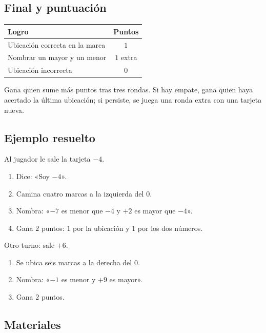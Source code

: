 \documentclass[12pt, letterpaper]{article}
\begin{document}
\subsection{Final y puntuación}

\begin{center}
\small
\begin{tabular}{@{}p{8.8cm} c@{}}
\toprule
\textbf{Logro} & \textbf{Puntos}\\
\midrule
Ubicación correcta en la marca & $1$\\
Nombrar un mayor y un menor & $1$ extra\\
Ubicación incorrecta & $0$\\
\bottomrule
\end{tabular}
\end{center}

Gana quien sume más puntos tras tres rondas. Si hay empate, gana quien haya acertado la última ubicación; si persiste, se juega una ronda extra con una tarjeta nueva.

\subsection{Ejemplo resuelto}

Al jugador le sale la tarjeta $-4$.

\begin{cuadrosolucion}
\begin{enumerate}[leftmargin=*]
  \item Dice: «Soy $-4$».
  \item Camina cuatro marcas a la izquierda del $0$.
  \item Nombra: «$-7$ es menor que $-4$ y $+2$ es mayor que $-4$».
  \item Gana $2$ puntos: $1$ por la ubicación y $1$ por los dos números.
\end{enumerate}
Otro turno: sale $+6$.
\begin{enumerate}[leftmargin=*]
  \item Se ubica seis marcas a la derecha del $0$.
  \item Nombra: «$-1$ es menor y $+9$ es mayor».
  \item Gana $2$ puntos.
\end{enumerate}
\end{cuadrosolucion}

\subsection{Materiales}
\end{document}
